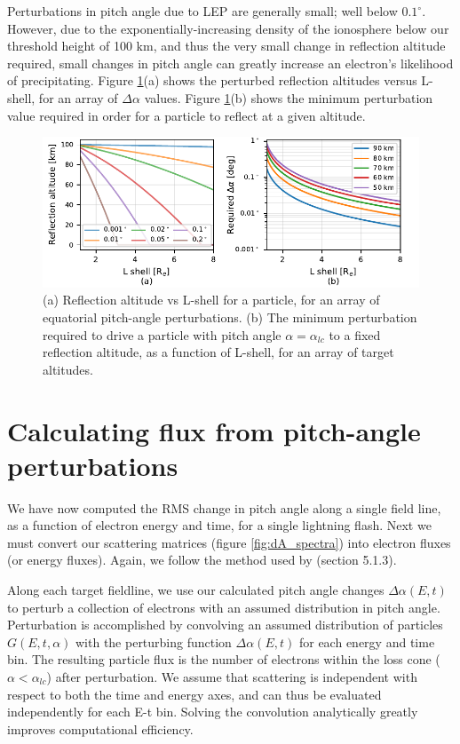 Perturbations in pitch angle due to LEP are generally small; well below $0.1^\circ$. However, due to the exponentially-increasing density of the ionosphere below our threshold height of 100 km, and thus the very small change in reflection altitude required, small changes in pitch angle can greatly increase an electron's likelihood of precipitating. Figure \ref{fig:pitch_angle_vs_altitude}(a) shows the perturbed reflection altitudes versus L-shell, for an array of $\Delta \alpha$ values. Figure \ref{fig:pitch_angle_vs_altitude}(b) shows the minimum perturbation value required in order for a particle to reflect at a given altitude.

\begin{figure}[h]
\begin{center}
\includegraphics{figures/pitch_angle_vs_depth.pdf}
\caption{(a) Reflection altitude vs L-shell for a particle, for an array of equatorial pitch-angle perturbations. (b) The minimum perturbation required to drive a particle with pitch angle $\alpha = \alpha_{lc}$ to a fixed reflection altitude, as a function of L-shell, for an array of target altitudes.}
\label{fig:pitch_angle_vs_altitude}
\end{center}
\end{figure}


\section{Calculating flux from pitch-angle perturbations}
\label{section:flux_from_pitch_angle}
We have now computed the RMS change in pitch angle along a single field line, as a function of electron energy and time, for a single lightning flash. Next we must convert our scattering matrices (figure \ref{fig:dA_spectra}) into electron fluxes (or energy fluxes). Again, we follow the method used by \cite{Bortnik2005} (section 5.1.3).

Along each target fieldline, we use our calculated pitch angle changes $\Delta \alpha(E,t)$ to perturb a collection of electrons with an assumed distribution in pitch angle. Perturbation is accomplished by convolving an assumed distribution of particles $G(E,t,\alpha)$ with the perturbing function $\Delta \alpha(E,t)$ for each energy and time bin. The resulting particle flux is the number of electrons within the loss cone ($\alpha < \alpha_{lc}$) after perturbation. We assume that scattering is independent with respect to both the time and energy axes, and can thus be evaluated independently for each E-t bin. Solving the convolution analytically greatly improves computational efficiency.


